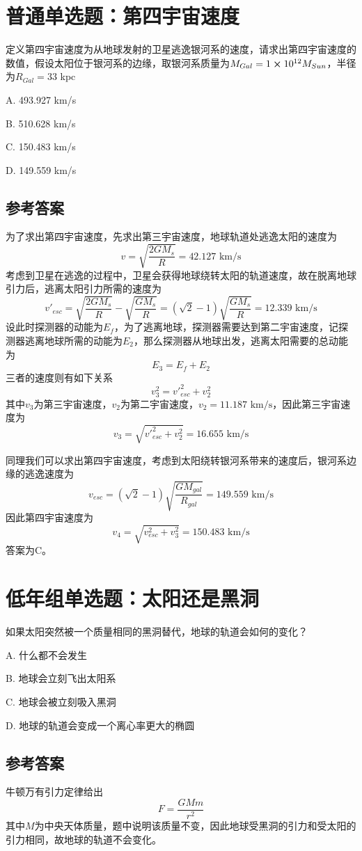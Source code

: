 \documentclass[UTF8]{ctexart}
\numberwithin{equation}{section}
\begin{document}
\newpage
\section{普通单选题：第四宇宙速度}
定义第四宇宙速度为从地球发射的卫星逃逸银河系的速度，请求出第四宇宙速度的数值，假设太阳位于银河系的边缘，取银河系质量为$M_{Gal} = 1\cross 10^{12}M_{Sun}$，半径为$R_{Gal} = 33$ kpc

A. 493.927 km/s 

B. 510.628 km/s 

C. 150.483 km/s 

D. 149.559 km/s

\subsection{参考答案}
为了求出第四宇宙速度，先求出第三宇宙速度，地球轨道处逃逸太阳的速度为
\[
v = \sqrt{\frac{2GM_{s}}{R}} = 42.127 \text{ km/s}
\]
考虑到卫星在逃逸的过程中，卫星会获得地球绕转太阳的轨道速度，故在脱离地球引力后，逃离太阳引力所需的速度为
\[
v'_{esc} = \sqrt{\frac{2GM_s}{R}} - \sqrt{\frac{GM_s}{R}} = (\sqrt{2}-1)\sqrt{\frac{GM_s}{R}} = 12.339 \text{ km/s}
\] 
设此时探测器的动能为$E_f$，为了逃离地球，探测器需要达到第二宇宙速度，记探测器逃离地球所需的动能为$E_2$，那么探测器从地球出发，逃离太阳需要的总动能为
\[
E_3 = E_f+E_2
\]
三者的速度则有如下关系
\[
v_3^2 = v'^2_{esc} + v_2^2
\]
其中$v_3$为第三宇宙速度，$v_2$为第二宇宙速度，$v_2 = 11.187 \text{ km/s}$，因此第三宇宙速度为
\[
v_3 = \sqrt{v'^2_{esc} + v_2^2} = 16.655 \text{ km/s}
\]

同理我们可以求出第四宇宙速度，考虑到太阳绕转银河系带来的速度后，银河系边缘的逃逸速度为
\[
v_{esc} = \left(\sqrt{2}-1\right)\sqrt{\frac{GM_{gal}}{R_{gal}}} = 149.559 \text{ km/s}
\]
因此第四宇宙速度为
\[
v_4 = \sqrt{v^2_{esc} + v_3^2} = 150.483 \text{ km/s}
\]
答案为C。

\newpage
\section{低年组单选题：太阳还是黑洞}
如果太阳突然被一个质量相同的黑洞替代，地球的轨道会如何的变化？

A. 什么都不会发生

B. 地球会立刻飞出太阳系

C. 地球会被立刻吸入黑洞

D. 地球的轨道会变成一个离心率更大的椭圆

\subsection{参考答案}
牛顿万有引力定律给出
\[
F = \frac{GMm}{r^2}
\]
其中$M$为中央天体质量，题中说明该质量不变，因此地球受黑洞的引力和受太阳的引力相同，故地球的轨道不会变化。
\end{document}
